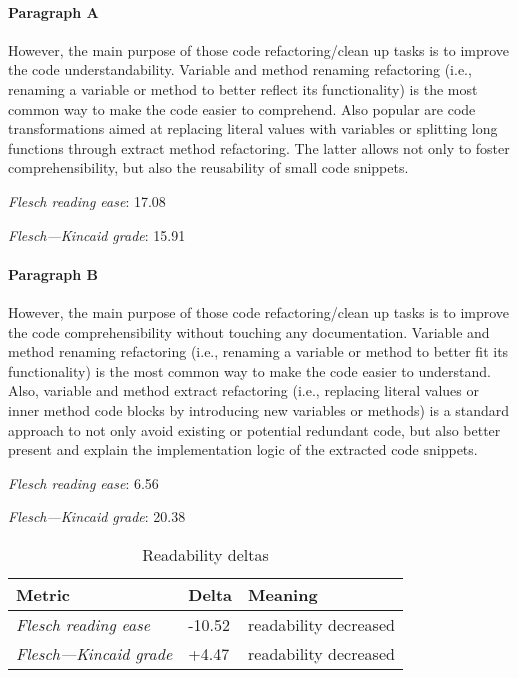 \paragraph{Paragraph A}
However, the main purpose of those code refactoring/clean up tasks is to improve the code understandability. Variable and method renaming refactoring (i.e., renaming a variable or method to better reflect its functionality) is the most common way to make the code easier to comprehend. Also popular are code transformations aimed at replacing literal values with variables or splitting long functions through extract method refactoring. The latter allows not only to foster comprehensibility, but also the reusability of small code snippets.\par\medskip
\emph{Flesch reading ease}: 17.08\par
\emph{Flesch---Kincaid grade}: 15.91

\paragraph{Paragraph B}
However, the main purpose of those code refactoring/clean up tasks is to improve the code comprehensibility without touching any documentation. Variable and method renaming refactoring (i.e., renaming a variable or method to better fit its functionality) is the most common way to make the code easier to understand. Also, variable and method extract refactoring (i.e., replacing literal values or inner method code blocks by introducing new variables or methods) is a standard approach to not only avoid existing or potential redundant code, but also better present and explain the implementation logic of the extracted code snippets.\par\medskip
\emph{Flesch reading ease}: 6.56\par
\emph{Flesch---Kincaid grade}: 20.38

\bigskip\begin{table}[!h]
\centering
\begin{tabular}{lll}
\toprule
               \textbf{Metric} & \textbf{Delta} &       \textbf{Meaning} \\
\midrule
    \emph{Flesch reading ease} &         -10.52 &  readability decreased \\
 \emph{Flesch---Kincaid grade} &          +4.47 &  readability decreased \\
\bottomrule
\end{tabular}
\caption*{Readability deltas}\end{table}

